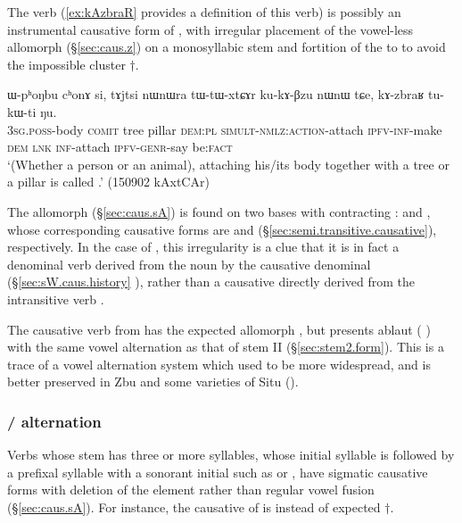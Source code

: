 The verb  (\ref{ex:kAzbraR} provides a definition of this verb) is possibly an instrumental causative form of , with irregular placement of the vowel-less allomorph  (§\ref{sec:caus.z}) on a monosyllabic stem and fortition of the  to  to avoid the impossible cluster $\dagger$.

\begin{exe} 
\ex \label{ex:kAzbraR}
\gll ɯ-pʰoŋbu cʰonɤ si, tɤjtsi nɯnɯra tɯ-tɯ-xtɕɤr ku-kɤ-βzu nɯnɯ tɕe, kɤ-zbraʁ tu-kɯ-ti ŋu.  \\
\textsc{3sg}.\textsc{poss}-body \textsc{comit} tree pillar \textsc{dem}:\textsc{pl}  \textsc{simult}-\textsc{nmlz}:\textsc{action}-attach \textsc{ipfv}-\textsc{inf}-make \textsc{dem} \textsc{lnk} \textsc{inf}-attach \textsc{ipfv}-\textsc{genr}-say be:\textsc{fact} \\
\glt `(Whether a person or an animal), attaching his/its body together with a tree or a pillar is called .' (150902 kAxtCAr)
\end{exe}
 
The  allomorph (§\ref{sec:caus.sA}) is found on two bases with contracting :  and , whose corresponding causative forms are   and  (§\ref{sec:semi.transitive.causative}), respectively. In the case of , this irregularity is a clue that it is in fact a denominal verb derived from the noun  by the causative denominal (§\ref{sec:sW.caus.history} ), rather than a causative directly derived from the intransitive verb .

 The causative verb  from  has the expected allomorph , but presents ablaut ( \fl{} ) with the same vowel alternation as that of stem II (§\ref{sec:stem2.form}). This is a trace of a vowel alternation system which used to be more widespread, and is better preserved in Zbu \citep{gong18these} and some varieties of Situ (\citealt[304, fn 10]{zhangsy18stem}).

  \subsubsection{/ alternation} \label{sec:sigm.caus.a.z}
Verbs whose stem has three or more syllables, whose initial syllable is  followed by a prefixal syllable with a sonorant initial such as  or , have sigmatic causative forms with deletion of the  element rather than regular vowel fusion (§\ref{sec:caus.sA}). For instance, the causative of  is  instead of expected $\dagger$.

